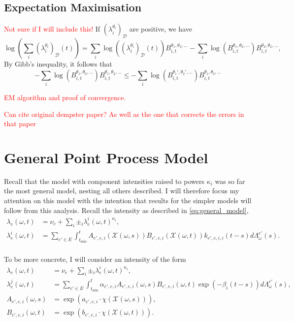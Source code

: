 \documentclass[honours,12pt]{unswthesis}
\numberwithin{equation}{section}
\begin{document}
\subsection{Expectation Maximisation}
\textcolor{red}{Not sure if I will include this!}
If $\left(\lambda_i^{\theta_i}\right)_\mathcal{D}$ are positive, we have
$$\log\left(\sum_i \left(\lambda_i^{\theta_i}\right)_{\mathcal{D}}(t)\right) = \sum_i \log\left(\left(\lambda_i^{\theta_i}\right)_\mathcal{D}(t)\right)B_{i,t}^{\theta_1,\theta_2,\ldots} - \sum_i \log\left( B_{i,t}^{\theta_1,\theta_2,\ldots}\right)B_{i,t}^{\theta_2,\theta_2,\ldots},$$
By Gibb's inequality, it follows that
$$- \sum_i \log\left( B_{i,t}^{\theta_1,\theta_2,\ldots}\right)B_{i,t}^{\theta_1,\theta_2,\ldots} \leq - \sum_i \log\left( B_{i,t}^{\theta_1',\theta_2',\ldots}\right)B_{i,t}^{\theta_1,\theta_2,\ldots} $$

\textcolor{red}{EM algorithm and proof of convergence.}

\textcolor{red}{Can cite original dempster paper? As well as the one that corrects the errors in that paper}

\section{General Point Process Model}
Recall that the model with component intensities raised to powers $\kappa_i$ was so far the most general model, nesting all others described. I will therefore focus my attention on this model with the intention that results for the simpler models will follow from this analysis. Recall the intensity as described in \eqref{eq:general_model},
\begin{equation*}
	\begin{align}
		\lambda_e(\omega,t) &= \nu_e + \sum_i \pm_i \lambda_e^i(\omega,t)^{\kappa_i}, \\
		\lambda_e^i(\omega,t) &= \sum_{e'\in E}\int_{t_\mathrm{min}}^t A_{e',e,i}(\mathcal{X}(\omega,s))B_{e',e,i}(\mathcal{X}(\omega,t))k_{e',e,i,i}(t-s)d\Lambda_\omega^{e'}(s). \\
	\end{align}
\end{equation*}

To be more concrete, I will consider an intensity of the form
\begin{equation}
	\begin{align}
		\lambda_e(\omega,t) &= \nu_e + \sum_i \pm_i \lambda_e^i(\omega,t)^{\kappa_i}, \\
		\lambda_e^j(\omega,t) &= \sum_{e'\in E}\int_{t_\mathrm{min}}^t \alpha_{e',e,i} A_{e',e,i}(\omega,s) B_{e',e,i}(\omega,t)\exp(-\beta_i(t-s))d\Lambda_\omega^{e'}(s), \\
		A_{e',e,i}(\omega,s) &= \exp(a_{e',e,i}\cdot\chi(\mathcal{X}(\omega,s))), \\
		B_{e',e,i}(\omega,t) &= \exp(b_{e',e,i}\cdot\chi(\mathcal{X}(\omega,t))).
	\end{align}
\end{equation}
\end{document}
